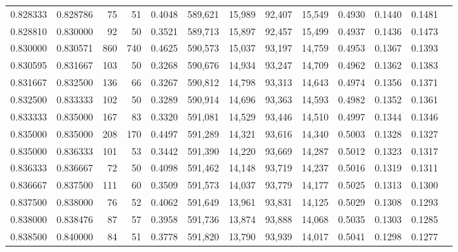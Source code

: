 \begin{tabular}{rrrrrrrrrrrrr}
0.828333 & 0.828786 &    75 &  51 &                                     0.4048 & 589,621 &  15,989 &  92,407 &  15,549 & 0.4930 & 0.1440 & 0.1481 \\
0.828810 & 0.830000 &    92 &  50 &                                     0.3521 & 589,713 &  15,897 &  92,457 &  15,499 & 0.4937 & 0.1436 & 0.1473 \\
0.830000 & 0.830571 &   860 & 740 &                                     0.4625 & 590,573 &  15,037 &  93,197 &  14,759 & 0.4953 & 0.1367 & 0.1393 \\
0.830595 & 0.831667 &   103 &  50 &                                     0.3268 & 590,676 &  14,934 &  93,247 &  14,709 & 0.4962 & 0.1362 & 0.1383 \\
0.831667 & 0.832500 &   136 &  66 &                                     0.3267 & 590,812 &  14,798 &  93,313 &  14,643 & 0.4974 & 0.1356 & 0.1371 \\
0.832500 & 0.833333 &   102 &  50 &                                     0.3289 & 590,914 &  14,696 &  93,363 &  14,593 & 0.4982 & 0.1352 & 0.1361 \\
0.833333 & 0.835000 &   167 &  83 &                                     0.3320 & 591,081 &  14,529 &  93,446 &  14,510 & 0.4997 & 0.1344 & 0.1346 \\
0.835000 & 0.835000 &   208 & 170 &                                     0.4497 & 591,289 &  14,321 &  93,616 &  14,340 & 0.5003 & 0.1328 & 0.1327 \\
0.835000 & 0.836333 &   101 &  53 &                                     0.3442 & 591,390 &  14,220 &  93,669 &  14,287 & 0.5012 & 0.1323 & 0.1317 \\
0.836333 & 0.836667 &    72 &  50 &                                     0.4098 & 591,462 &  14,148 &  93,719 &  14,237 & 0.5016 & 0.1319 & 0.1311 \\
0.836667 & 0.837500 &   111 &  60 &                                     0.3509 & 591,573 &  14,037 &  93,779 &  14,177 & 0.5025 & 0.1313 & 0.1300 \\
0.837500 & 0.838000 &    76 &  52 &                                     0.4062 & 591,649 &  13,961 &  93,831 &  14,125 & 0.5029 & 0.1308 & 0.1293 \\
0.838000 & 0.838476 &    87 &  57 &                                     0.3958 & 591,736 &  13,874 &  93,888 &  14,068 & 0.5035 & 0.1303 & 0.1285 \\
0.838500 & 0.840000 &    84 &  51 &                                     0.3778 & 591,820 &  13,790 &  93,939 &  14,017 & 0.5041 & 0.1298 & 0.1277 \\

\end{tabular}
